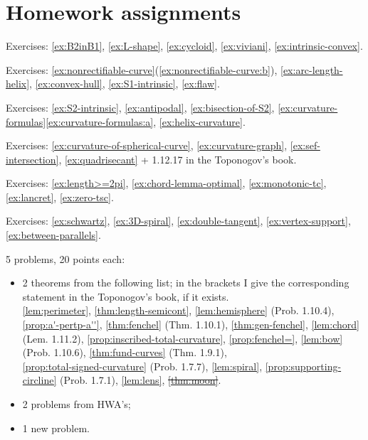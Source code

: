 \chapter{Homework assignments}

Exercises: 
\ref{ex:B2inB1}, 
\ref{ex:L-shape}, 
\ref{ex:cycloid}, 
\ref{ex:viviani}, 
\ref{ex:intrinsic-convex}.

Exercises: 
\ref{ex:nonrectifiable-curve}(\ref{ex:nonrectifiable-curve:b}), 
\ref{ex:arc-length-helix}, 
\ref{ex:convex-hull},  
\ref{ex:S1-intrinsic},  
\ref{ex:flaw}.

Exercises:
\ref{ex:S2-intrinsic},
\ref{ex:antipodal},
\ref{ex:bisection-of-S2}, 
\ref{ex:curvature-formulas}\ref{ex:curvature-formulas:a},    
\ref{ex:helix-curvature}.


Exercises:
\ref{ex:curvature-of-spherical-curve},
\ref{ex:curvature-graph},
\ref{ex:sef-intersection},
\ref{ex:quadrisecant} 
+
1.12.17 in the Toponogov's book.

Exercises:
\ref{ex:length>=2pi},
\ref{ex:chord-lemma-optimal},
\ref{ex:monotonic-tc},
\ref{ex:lancret},
\ref{ex:zero-tsc}.

Exercises:
\ref{ex:schwartz},
\ref{ex:3D-spiral},
\ref{ex:double-tangent},
\ref{ex:vertex-support},
\ref{ex:between-parallels}.

 5 problems, 20 points each:
\begin{itemize}
\item 2 theorems from the following list; in the brackets I give the corresponding statement in the Toponogov's book, if it exists.\\
\ref{lem:perimeter},
\ref{thm:length-semicont},
\ref{lem:hemisphere} (Prob. 1.10.4),\\
\ref{prop:a'-pertp-a''},
\ref{thm:fenchel} (Thm. 1.10.1),
\ref{thm:gen-fenchel},
\ref{lem:chord} (Lem. 1.11.2),
\ref{prop:inscribed-total-curvature},
\ref{prop:fenchel=},
\ref{lem:bow} (Prob. 1.10.6),
\ref{thm:fund-curves} (Thm. 1.9.1),\\
\ref{prop:total-signed-curvature} (Prob. 1.7.7),
\ref{lem:spiral},
\ref{prop:supporting-circline} (Prob. 1.7.1),
\ref{lem:lens},
\sout{\ref{thm:moon}}.
\item 2 problems from HWA's;
\item 1 new problem.
\end{itemize}

\noindent{\rule{\textwidth}{.1mm}}


